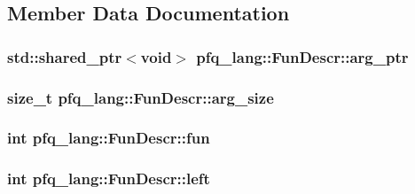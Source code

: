 \subsection{Member Data Documentation}
\hypertarget{structpfq__lang_1_1FunDescr_aa96cb2764befea1e5b8b61927e4a4871}{
\subsubsection[{arg\+\_\+ptr}]{\setlength{\rightskip}{0pt plus 5cm}std\+::shared\+\_\+ptr$<$void$>$ pfq\+\_\+lang\+::\+Fun\+Descr\+::arg\+\_\+ptr}}\label{structpfq__lang_1_1FunDescr_aa96cb2764befea1e5b8b61927e4a4871}
\hypertarget{structpfq__lang_1_1FunDescr_a6690de6f15bab43587dadf2f88491ae4}{
\subsubsection[{arg\+\_\+size}]{\setlength{\rightskip}{0pt plus 5cm}size\+\_\+t pfq\+\_\+lang\+::\+Fun\+Descr\+::arg\+\_\+size}}\label{structpfq__lang_1_1FunDescr_a6690de6f15bab43587dadf2f88491ae4}
\hypertarget{structpfq__lang_1_1FunDescr_a073bf3b9daa315c7498dacd6d4c8266f}{
\subsubsection[{fun}]{\setlength{\rightskip}{0pt plus 5cm}int pfq\+\_\+lang\+::\+Fun\+Descr\+::fun}}\label{structpfq__lang_1_1FunDescr_a073bf3b9daa315c7498dacd6d4c8266f}
\hypertarget{structpfq__lang_1_1FunDescr_abdd618d54ab1e074a83d698d5a4b8197}{
\subsubsection[{left}]{\setlength{\rightskip}{0pt plus 5cm}int pfq\+\_\+lang\+::\+Fun\+Descr\+::left}}\label{structpfq__lang_1_1FunDescr_abdd618d54ab1e074a83d698d5a4b8197}
